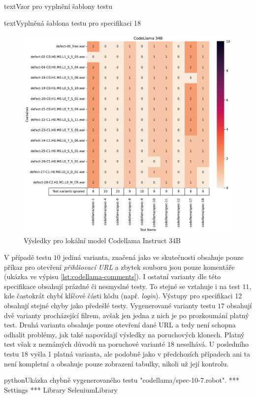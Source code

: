 \documentclass[czech, ma, kiv, he, iso690numb, pdf, viewonly]{fasthesis}
\begin{document}
\begin{code}{text}{Vzor pro vyplnění šablony testu \label{lst:template}}
{\begin{code}{text}{Vyplněná šablona testu pro specifikaci 18 \label{lst:spec18}}
{            \begin{figure}
                \includegraphics[width=\textwidth]{pic/codellama-34b-results.pdf}
                \caption{Výsledky pro lokální model Codellama Instruct 34B}
                \label{fig:res:codellama}
            \end{figure}

            V případě testu \(10\) jediná varianta, značená jako  ve skutečnosti obsahuje pouze příkaz pro otevření \textit{přihlšovací URL} a zbytek souboru jsou pouze komentáře (ukázka ve výpisu \ref{lst:codellama-comments}). I ostatní varianty dle této specifikace obsahují prázdné či nesmyslné testy. To stejné se vztahuje i na test \(11\), kde častokrát chybí klíčové části kôdu (např. \textit{login}). Výstupy pro specifikaci 12 obsahují stejné chyby jako předešlé testy. Vygenerované varianty testu \(17\) obsahují dvě varianty procházející filrem, avšak jen jedna z nich je po prozkoumání platný test. Druhá varianta obsahuje pouze otevření dané URL a tedy není schopna odhalit problémy, jak také napovídají výsledky na poruchových klonech. Platný test však z neznámých důvodů na poruchové varianté \(18\) neselhává. U posledního testu \(18\) vyšla 1 platná varianta, ale podobně jako v předchozích případech ani ta není kompletní a obsahuje pouze zobrazení tabulky, nikoli už její kontrolu.

            \begin{code}{python}{Ukázka chybně vygenerovaného testu "codellama/spec-10-7.robot". \label{lst:codellama-comments}}
*** Settings ***
Library           SeleniumLibrary


\end{code}}
\end{code}}
\end{code}
\end{document}
